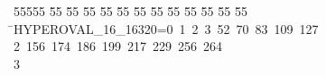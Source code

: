 %
%
\begin{tabbing}
55555 \= 55 \= 55 \= 55 \= 55 \= 55 \= 55 \= 55 \= 55 \= 55 \= 55 \= 55 \= 55 \= \>HYPEROVAL\_16\_16320=0\ 1\ 2\ 3\ 52\ 70\ 83\ 109\ 127\ \\[0pt]
2\ 156\ 174\ 186\ 199\ 217\ 229\ 256\ 264\\[0pt]
3\>\end{tabbing}
